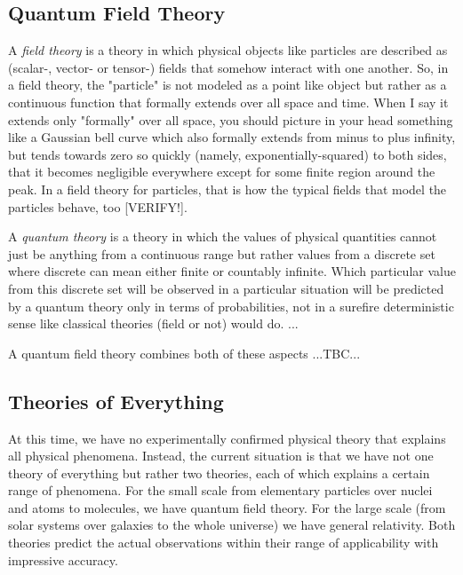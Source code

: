 \subsection{Quantum Field Theory}

A \emph{field theory} is a theory in which physical objects like particles are described as (scalar-, vector- or tensor-) fields that somehow interact with one another. So, in a field theory, the "particle" is not modeled as a point like object but rather as a continuous function that formally extends over all space and time. When I say it extends only "formally" over all space, you should picture in your head something like a Gaussian bell curve which also formally extends from minus to plus infinity, but tends towards zero so quickly (namely, exponentially-squared) to both sides, that it becomes negligible everywhere except for some finite region around the peak. In a field theory for particles, that is how the typical fields that model the particles behave, too [VERIFY!].

\medskip
A \emph{quantum theory} is a theory in which the values of physical quantities cannot just be anything from a continuous range but rather values from a discrete set where discrete can mean either finite or countably infinite. Which particular value from this discrete set will be observed in a particular situation will be predicted by a quantum theory only in terms of probabilities, not in a surefire deterministic sense like classical theories (field or not) would do. ...

\medskip
A quantum field theory combines both of these aspects ...TBC...

\subsection{Theories of Everything}
At this time, we have no experimentally confirmed physical theory that explains all physical phenomena. Instead, the current situation is that we have not one theory of everything but rather two theories, each of which explains a certain range of phenomena. For the small scale from elementary particles over nuclei and atoms to molecules, we have quantum field theory. For the large scale (from solar systems over galaxies to the whole universe) we have general relativity. Both theories predict the actual observations within their range of applicability with impressive accuracy. 

